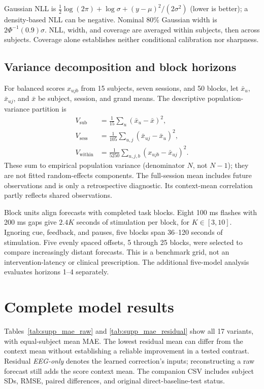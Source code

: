 \documentclass[a4paper,10pt,onecolumn]{IEEEtran}
\begin{document}
Gaussian NLL is
$\frac12\log(2\pi)+\log\sigma+(y-\mu)^2/(2\sigma^2)$ (lower is better);
a density-based NLL can be negative.
Nominal 80\% Gaussian width is $2\Phi^{-1}(0.9)\sigma$.
NLL, width, and coverage are averaged within subjects, then across subjects.
Coverage alone establishes neither conditional calibration nor sharpness.

\subsection{Variance decomposition and block horizons}

For balanced scores $x_{ujb}$ from 15 subjects, seven sessions, and 50 blocks,
let $\bar x_u$, $\bar x_{uj}$, and $\bar x$ be subject, session, and grand means.
The descriptive population-variance partition is
\begin{align}
V_{\mathrm{sub}}&=\frac1{15}\sum_u(\bar x_u-\bar x)^2,\\
V_{\mathrm{sess}}&=\frac1{105}\sum_{u,j}(\bar x_{uj}-\bar x_u)^2,\\
V_{\mathrm{within}}&=\frac1{5250}\sum_{u,j,b}(x_{ujb}-\bar x_{uj})^2.
\end{align}
These sum to empirical population variance (denominator $N$, not $N-1$);
they are not fitted random-effects components.
The full-session mean includes future observations and is only a retrospective
diagnostic. Its context-mean correlation partly reflects shared observations.

Block units align forecasts with completed task blocks.
Eight 100 ms flashes with 200 ms gaps give $2.4K$ seconds of stimulation
per block, for $K\in[3,10]$. Ignoring cue, feedback, and pauses, five blocks
span 36--120 seconds of stimulation. Five evenly spaced offsets, 5 through
25 blocks, were selected to compare increasingly distant forecasts.
This is a benchmark grid, not an intervention-latency or clinical prescription.
The additional five-model analysis evaluates horizons 1--4 separately.

\clearpage
\section{Complete model results}

Tables~\ref{tab:supp_mae_raw} and \ref{tab:supp_mae_residual} show all 17 variants,
with equal-subject mean MAE. The lowest residual mean can differ from the
context mean without establishing a reliable improvement in a tested contrast.
Residual \emph{EEG-only} denotes the learned correction's inputs; reconstructing
a raw forecast still adds the score context mean.
The companion CSV includes subject SDs, RMSE, paired differences,
and original direct-baseline-test status.
\end{document}
